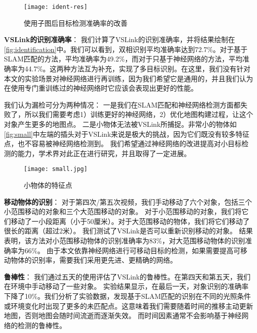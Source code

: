 \begin{figure*}[htbp]
	\centering
	\texttt{[image: ident-res]}
	\caption{使用子图后目标检测准确率的改善}
	\label{fig:identification}
\end{figure*}

\textbf{VSLink的识别准确率}：
我们计算了VSLink的识别准确率，并将结果绘制在\autoref{fig:identification}中。我们可以看到，双相识别平均准确率达到72.7\%。对于基于SLAM匹配的方法，平均准确率为49.2\%，而对于只基于神经网络的方法，平均准确率为44.7\%。这两种方法互为补充，实现了多目标识别。在这里，我们没有针对本文的实验场景对神经网络进行再训练，因为我们希望它是通用的，并且我们认为在使用专门重训练过的神经网络时它应该会表现出更好的性能。

我们认为漏检可分为两种情况：
一是我们在SLAM匹配和神经网络检测方面都失败了，所以我们需要考虑1）训练更好的神经网络，2）优化地图构建过程，让这个对象产生更多的地图点。
二是小物体无法被VSLink所捕捉。非常小的物体如\autoref{fig:small}中左端的插头对于VSLink来说是极大的挑战，因为它们既没有较多特征点，也不容易被神经网络检测到。
我们希望通过神经网络的改进提高对小目标检测的能力，学术界对此正在进行研究，并且取得了一定进展。
\begin{figure}[htbp]
	\centering
	\texttt{[image: small.jpg]}
	\caption{小物体的特征点}
	\label{fig:small}
\end{figure}

\textbf{移动物体的识别}：
对于第四次/第五次视频，我们手动移动了六个对象，包括三个小范围移动的对象和三个大范围移动的对象。
对于小范围移动的对象，我们将它们移动了一小段距离（小于50厘米）。对于大范围移动的物体，我们将它们移动了很长的距离（超过2米）。
我们测试了VSLink是否可以重新识别移动的对象。
结果表明，该方法对小范围移动物体的识别准确率为83\%，对大范围移动物体的识别准确率为66\%。
由于本文依靠神经网络进行可移动目标的检测，如果需要提高可移动物体的识别率，需要我们采用更先进、更精确的网络。


\textbf{鲁棒性}：
我们通过五天的使用评估了VSLink的鲁棒性。在第四天和第五天，我们在环境中手动移动了一些对象。
实验结果显示，在最后一天，对象识别的准确率下降了10\%。我们分析了实验数据，发现基于SLAM匹配的识别在不同的光照条件或环境变化时出现了更多的未匹配点。这意味着我们需要随着时间的推移主动更新地图，否则地图会随时间流逝而逐渐失效。
而时间因素通常不会影响基于神经网络的检测的鲁棒性。




